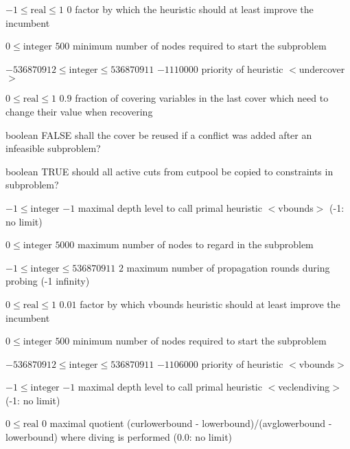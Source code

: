 %
{$-1\leq\textrm{real}\leq1$}%
{$0$}%
{factor by which the heuristic should at least improve the incumbent}%
{}

%
{$0\leq\textrm{integer}$}%
{$500$}%
{minimum number of nodes required to start the subproblem}%
{}

%
{$-536870912\leq\textrm{integer}\leq536870911$}%
{$-1110000$}%
{priority of heuristic $<$undercover$>$}%
{}

%
{$0\leq\textrm{real}\leq1$}%
{$0.9$}%
{fraction of covering variables in the last cover which need to change their value when recovering}%
{}

%
{boolean}%
{FALSE}%
{shall the cover be reused if a conflict was added after an infeasible subproblem?}%
{}

%
{boolean}%
{TRUE}%
{should all active cuts from cutpool be copied to constraints in subproblem?}%
{}

%
{$-1\leq\textrm{integer}$}%
{$-1$}%
{maximal depth level to call primal heuristic $<$vbounds$>$ (-1: no limit)}%
{}

%
{$0\leq\textrm{integer}$}%
{$5000$}%
{maximum number of nodes to regard in the subproblem}%
{}

%
{$-1\leq\textrm{integer}\leq536870911$}%
{$2$}%
{maximum number of propagation rounds during probing (-1 infinity)}%
{}

%
{$0\leq\textrm{real}\leq1$}%
{$0.01$}%
{factor by which vbounds heuristic should at least improve the incumbent}%
{}

%
{$0\leq\textrm{integer}$}%
{$500$}%
{minimum number of nodes required to start the subproblem}%
{}

%
{$-536870912\leq\textrm{integer}\leq536870911$}%
{$-1106000$}%
{priority of heuristic $<$vbounds$>$}%
{}

%
{$-1\leq\textrm{integer}$}%
{$-1$}%
{maximal depth level to call primal heuristic $<$veclendiving$>$ (-1: no limit)}%
{}

%
{$0\leq\textrm{real}$}%
{$0$}%
{maximal quotient (curlowerbound - lowerbound)/(avglowerbound - lowerbound) where diving is performed (0.0: no limit)}%
{}

